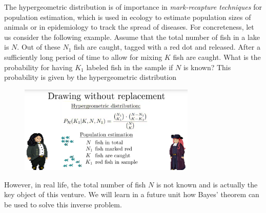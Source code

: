\documentclass[12pt, a4paper]{scrartcl}
\begin{document}
The hypergeometric distribution is of importance in \textit{mark-recapture techniques} for population estimation, which is used in ecology to estimate population sizes of animals or in epidemiology to track the spread of diseases. 
For concreteness, let us consider the following example. Assume that the total number of fish in a lake is $N$. Out of these $N_1$ fish are caught, tagged with a red dot and released. After a sufficiently long period of time to allow for mixing $K$ fish are caught.
What is the probability for having $K_1$ labeled fish in the sample if $N$ is known? This probability is given by the hypergeometric distribution
 \begin{figure}[H]
	\centering
	\includegraphics[width=0.75\textwidth]{4_8.png}
\end{figure}
However, in real life, the total number of fish $N$ is not known and is actually the key object of this venture.
We will learn in a future unit how Bayes’ theorem can be used to solve this inverse problem.\\
\end{document}
